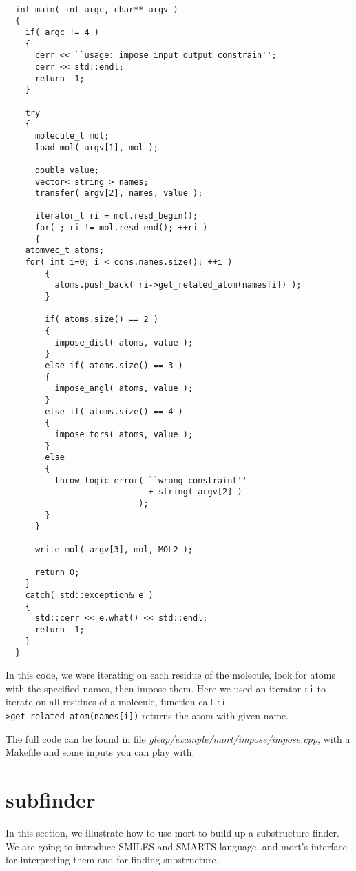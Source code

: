 \documentclass[letterpaper]{book}
\begin{document}
\begin{lstlisting}

  int main( int argc, char** argv )
  {
    if( argc != 4 )
    {
      cerr << ``usage: impose input output constrain'';
      cerr << std::endl;
      return -1;
    }

    try
    {
      molecule_t mol;
      load_mol( argv[1], mol );
            
      double value;
      vector< string > names;
      transfer( argv[2], names, value );

      iterator_t ri = mol.resd_begin();
      for( ; ri != mol.resd_end(); ++ri )
      {
	atomvec_t atoms;
	for( int i=0; i < cons.names.size(); ++i )
        {
          atoms.push_back( ri->get_related_atom(names[i]) );
        }

        if( atoms.size() == 2 )
        {
          impose_dist( atoms, value );
        }
        else if( atoms.size() == 3 )
        {
          impose_angl( atoms, value );
        }
        else if( atoms.size() == 4 )
        {
          impose_tors( atoms, value );
        }
        else
        {
          throw logic_error( ``wrong constraint'' 
                             + string( argv[2] ) 
                           );
        }
      }

      write_mol( argv[3], mol, MOL2 );

      return 0;
    }
    catch( std::exception& e )
    {
      std::cerr << e.what() << std::endl;
      return -1;
    }
  }

\end{lstlisting}

In this code, we were iterating on each residue of the molecule, look for atoms with the 
specified names, then impose them. Here we used an iterator \lstinline$ri$ to iterate on
all residues of a molecule, function call \lstinline$ri->get_related_atom(names[i])$ returns
the atom with given name.

The full code can be found in file {\it gleap/example/mort/impose/impose.cpp}, with a Makefile 
and some inputs you can play with.


\section{subfinder}
  In this section, we illustrate how to use mort to build up a substructure finder. We are 
going to introduce SMILES and SMARTS language, and mort's interface for interpreting them and for
finding substructure.
\end{document}
